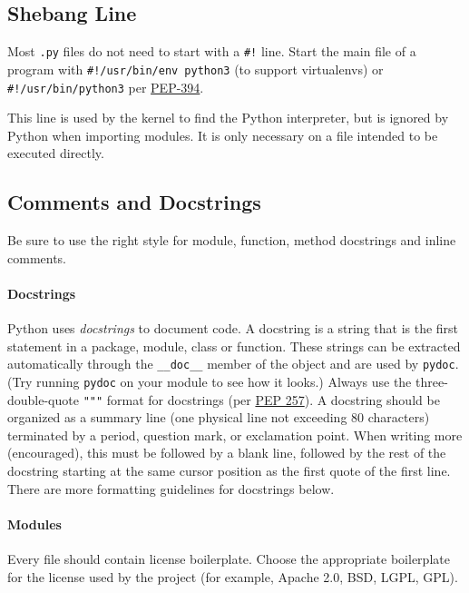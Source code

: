 \documentclass[
]{article}
\begin{document}
\subsection{Shebang Line}

Most \texttt{.py} files do not need to start with a \texttt{\#!} line.
Start the main file of a program with \texttt{\#!/usr/bin/env\ python3}
(to support virtualenvs) or \texttt{\#!/usr/bin/python3} per
\href{https://peps.python.org/pep-0394/}{PEP-394}.

This line is used by the kernel to find the Python interpreter, but is
ignored by Python when importing modules. It is only necessary on a file
intended to be executed directly.

\subsection{Comments and Docstrings}

Be sure to use the right style for module, function, method docstrings
and inline comments.

\paragraph{Docstrings}

Python uses \emph{docstrings} to document code. A docstring is a string
that is the first statement in a package, module, class or function.
These strings can be extracted automatically through the
\texttt{\_\_doc\_\_} member of the object and are used by
\texttt{pydoc}. (Try running \texttt{pydoc} on your module to see how it
looks.) Always use the three-double-quote \texttt{"""} format for
docstrings (per \href{https://peps.python.org/pep-0257/}{PEP 257}). A
docstring should be organized as a summary line (one physical line not
exceeding 80 characters) terminated by a period, question mark, or
exclamation point. When writing more (encouraged), this must be followed
by a blank line, followed by the rest of the docstring starting at the
same cursor position as the first quote of the first line. There are
more formatting guidelines for docstrings below.

\paragraph{Modules}

Every file should contain license boilerplate. Choose the appropriate
boilerplate for the license used by the project (for example, Apache
2.0, BSD, LGPL, GPL).
\end{document}
